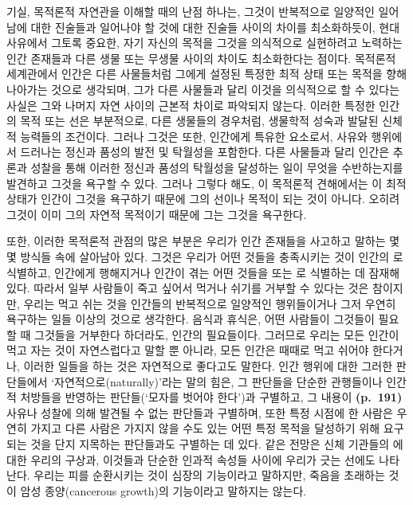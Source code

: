 기실, 목적론적 자연관을 이해할 때의 난점 하나는, 그것이 반복적으로
일양적인 일어남에 대한 진술들과 일어나야 할 것에 대한 진술들 사이의
차이를 최소화하듯이, 현대 사유에서 그토록 중요한, 자기 자신의 목적을
 그것을 의식적으로 실현하려고 노력하는 인간 존재들과
다른 생물 또는 무생물 사이의 차이도 최소화한다는 점이다. 목적론적
세계관에서 인간은 다른 사물들처럼 그에게 설정된 특정한 최적 상태 또는
목적을 향해 나아가는 것으로 생각되며, 그가 다른 사물들과 달리 이것을
의식적으로 할 수 있다는 사실은 그와 나머지 자연 사이의 근본적 차이로
파악되지 않는다. 이러한 특정한 인간의 목적 또는 선은 부분적으로, 다른
생물들의 경우처럼, 생물학적 성숙과 발달된 신체적 능력들의 조건이다.
그러나 그것은 또한, 인간에게 특유한 요소로서, 사유와 행위에서 드러나는
정신과 품성의 발전 및 탁월성을 포함한다. 다른 사물들과 달리 인간은
추론과 성찰을 통해 이러한 정신과 품성의 탁월성을 달성하는 일이 무엇을
수반하는지를 발견하고 그것을 욕구할 수 있다. 그러나 그렇다 해도, 이
목적론적 견해에서는 이 최적 상태가 인간이 그것을 욕구하기 때문에 그의
선이나 목적이 되는 것이 아니다. 오히려 그것이 이미 그의 자연적 목적이기
때문에 그는 그것을 욕구한다.

또한, 이러한 목적론적 관점의 많은 부분은 우리가 인간 존재들을 사고하고
말하는 몇몇 방식들 속에 살아남아 있다. 그것은 우리가 어떤 것들을
충족시키는 것이  인간의 로
식별하고, 인간에게 행해지거나 인간이 겪는 어떤 것들을 
또는 로 식별하는 데 잠재해 있다. 따라서 일부 사람들이
죽고 싶어서 먹거나 쉬기를 거부할 수 있다는 것은 참이지만, 우리는 먹고
쉬는 것을 인간들의 반복적으로 일양적인 행위들이거나 그저 우연히 욕구하는
일들 이상의 것으로 생각한다. 음식과 휴식은, 어떤 사람들이 그것들이
필요할 때 그것들을 거부한다 하더라도, 인간의 필요들이다. 그러므로 우리는
모든 인간이 먹고 자는 것이 자연스럽다고 말할 뿐 아니라, 모든 인간은
때때로 먹고 쉬어야 한다거나, 이러한 일들을 하는 것은 자연적으로 좋다고도
말한다. 인간 행위에 대한 그러한 판단들에서 ‘자연적으로(naturally)’라는
말의 힘은, 그 판단들을 단순한 관행들이나 인간적 처방들을 반영하는
판단들(‘모자를 벗어야 한다’)과 구별하고, 그 내용이 \textbf{(p.~191)}
사유나 성찰에 의해 발견될 수 없는 판단들과 구별하며, 또한 특정 시점에 한
사람은 우연히 가지고 다른 사람은 가지지 않을 수도 있는 어떤 특정 목적을
달성하기 위해 요구되는 것을 단지 지목하는 판단들과도 구별하는 데 있다.
같은 전망은 신체 기관들의 에 대한 우리의 구상과,
이것들과 단순한 인과적 속성들 사이에 우리가 긋는 선에도 나타난다. 우리는
피를 순환시키는 것이 심장의 기능이라고 말하지만, 죽음을 초래하는 것이
암성 종양(cancerous growth)의 기능이라고 말하지는 않는다.

